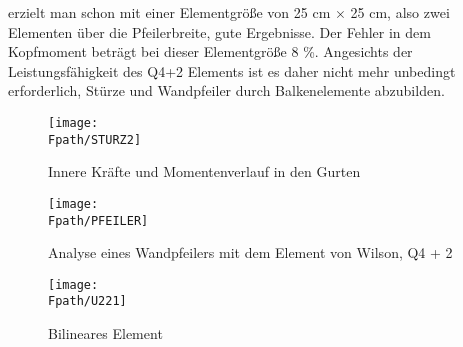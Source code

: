 {{\noindent erzielt} man schon mit einer Elementgr\"{o}{\ss}e von 25 cm $\times $ 25 cm, also zwei Elementen \"{u}ber die Pfeilerbreite, gute Ergebnisse. Der Fehler in dem Kopfmoment betr\"{a}gt bei dieser Elementgr\"{o}{\ss}e 8 \%. Angesichts der Leistungsf\"{a}higkeit des Q4+2 Elements ist es daher nicht mehr unbedingt erforderlich, St\"{u}rze und Wandpfeiler durch Balkenelemente abzubilden.

\begin{figure}[tbp] \centering
\if {} \sidecaption \fi
\texttt{[image: \\Fpath/STURZ2]}
\caption{Innere Kr\"{a}fte und Momentenverlauf in den Gurten} \label{Sturz2}
\end{figure}%

\begin{figure}[tbp] \centering
\if {} \sidecaption \fi
\texttt{[image: \\Fpath/PFEILER]}
\caption{Analyse eines Wandpfeilers mit dem Element von Wilson, Q4 + 2} \label{Pfeiler}
\end{figure}%

\begin{figure}[tbp] \centering
\centering
\if {} \sidecaption[t] \fi
\texttt{[image: \\Fpath/U221]}
\caption{Bilineares Element}
\label{U221}
\end{figure}%

}
